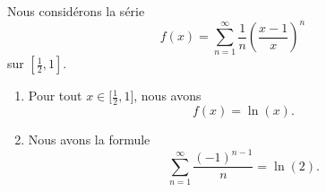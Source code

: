 \begin{lemma}       \label{LEMooRIQTooLomsqD}
	Nous considérons la série
	\begin{equation}
		f(x)=\sum_{n=1}^{\infty}\frac{1}{ n }\left( \frac{ x-1 }{ x } \right)^n
	\end{equation}
	sur \( [\frac{ 1 }{2},1]\).

	\begin{enumerate}
		\item
		      Pour tout \( x\in \mathopen[ \frac{ 1 }{2},1\mathclose]\), nous avons
		      \begin{equation}
			      f(x)=\ln(x).
		      \end{equation}
		\item
		      Nous avons la formule
		      \begin{equation}
			      \sum_{n=1}^{\infty}\frac{ (-1)^{n-1} }{ n }=\ln(2).
		      \end{equation}
	\end{enumerate}
\end{lemma}


